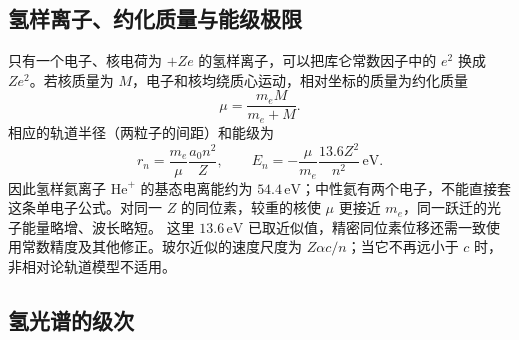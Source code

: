 \subsection{氢样离子、约化质量与能级极限}
只有一个电子、核电荷为 $+Ze$ 的氢样离子，可以把库仑常数因子中的 $e^2$ 换成 $Ze^2$。若核质量为 $M$，电子和核均绕质心运动，相对坐标的质量为约化质量
\[
 \mu=\frac{m_eM}{m_e+M}.
\]
相应的轨道半径（两粒子的间距）和能级为
\[
 r_n=\frac{m_e}{\mu}\frac{a_0n^2}{Z},\qquad
 E_n=-\frac{\mu}{m_e}\frac{13.6Z^2}{n^2}\,\mathrm{eV}.
\]
因此氢样氦离子 $\mathrm{He}^+$ 的基态电离能约为 $54.4\,\mathrm{eV}$；中性氦有两个电子，不能直接套这条单电子公式。对同一 $Z$ 的同位素，较重的核使 $\mu$ 更接近 $m_e$，同一跃迁的光子能量略增、波长略短。
这里 $13.6\,\mathrm{eV}$ 已取近似值，精密同位素位移还需一致使用常数精度及其他修正。玻尔近似的速度尺度为 $Z\alpha c/n$；当它不再远小于 $c$ 时，非相对论轨道模型不适用。

\subsection{氢光谱的级次}

